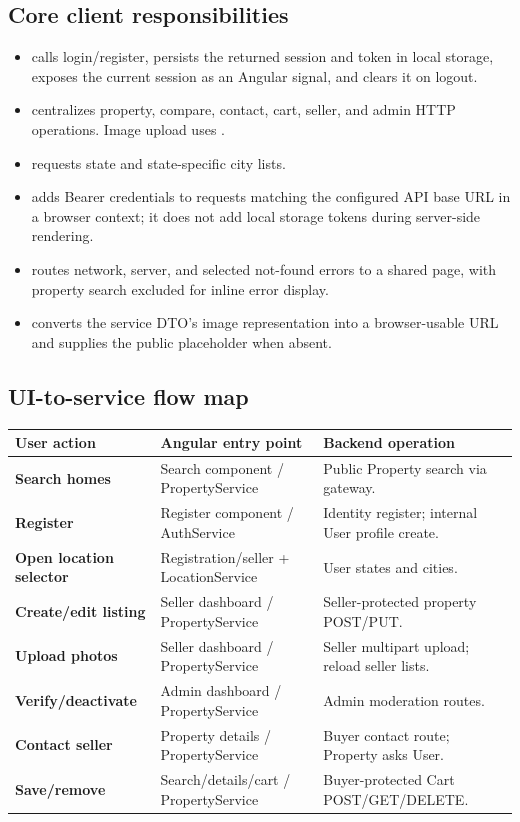 \documentclass[10pt,a4paper]{article}
\newcommand{\code}[1]{\texttt{\detokenize{#1}}}
\begin{document}
\subsection{Core client responsibilities}
\begin{itemize}
  \item {} calls login/register, persists the returned session and
  token in local storage, exposes the current session as an Angular signal, and clears
  it on logout.
  \item {} centralizes property, compare, contact, cart,
  seller, and admin HTTP operations. Image upload uses \code{FormData}.
  \item {} requests state and state-specific city lists.
  \item {} adds Bearer credentials to requests matching the
  configured API base URL in a browser context; it does not add local storage tokens
  during server-side rendering.
  \item {} routes network, server, and selected not-found
  errors to a shared page, with property search excluded for inline error display.
  \item {} converts the service DTO's image representation
  into a browser-usable URL and supplies the public placeholder when absent.
\end{itemize}

\subsection{UI-to-service flow map}
\begin{tabularx}{\textwidth}{>{\bfseries}p{30mm} p{47mm} X}
\toprule
User action & Angular entry point & Backend operation\\
\midrule
Search homes & Search component / PropertyService & Public Property search via gateway.\\
Register & Register component / AuthService & Identity register; internal User profile create.\\
Open location selector & Registration/seller + LocationService & User states and cities.\\
Create/edit listing & Seller dashboard / PropertyService & Seller-protected property POST/PUT.\\
Upload photos & Seller dashboard / PropertyService & Seller multipart upload; reload seller lists.\\
Verify/deactivate & Admin dashboard / PropertyService & Admin moderation routes.\\
Contact seller & Property details / PropertyService & Buyer contact route; Property asks User.\\
Save/remove & Search/details/cart / PropertyService & Buyer-protected Cart POST/GET/DELETE.\\
\bottomrule
\end{tabularx}
\end{document}
